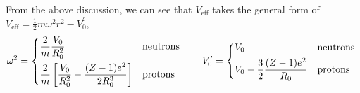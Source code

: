 \documentclass{school-22.101-notes}
\begin{document}
From the above discussion, we can see that $V_{\mathrm{eff}}$ takes the general form of $\boxed{V_{\mathrm{eff}} = \frac{1}{2} m \omega^2 r^2 - V_0^{\prime}},$ 
\begin{align}
\omega^2 =
\begin{dcases*}
\frac{2}{m} \frac{V_0}{R_0^2}  & neutrons \\
\frac{2}{m} \left[ \frac{V_0}{R_0^2} - \frac{(Z-1) e^2}{2 R_0^3} \right] & protons \\
\end{dcases*}
\fsp \fsp \fsp \fsp \fsp
V_0^{\prime} = 
\begin{dcases*}
V_0 & neutrons \\
V_0 - \frac{3}{2} \frac{(Z-1) e^2}{R_0} & protons \\
\end{dcases*}
\end{align}
\end{document}
